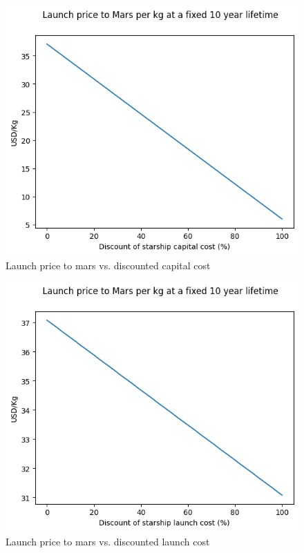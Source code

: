 \documentclass[fleqn,10pt]{Stylesheet} %
\begin{document}

\begin{figure}
    \centering
    \includegraphics[width=\linewidth]{fig_discflights.png}
    \caption{Launch price to mars vs. discounted capital cost}
    \label{fig:flight_cost_cap}
\end{figure}

\begin{figure}
    \centering
    \includegraphics[width=\linewidth]{fig_disclaunchflights.png}
    \caption{Launch price to mars vs. discounted launch cost}
    \label{fig:flight_cost_launch}
\end{figure}
\end{document}
